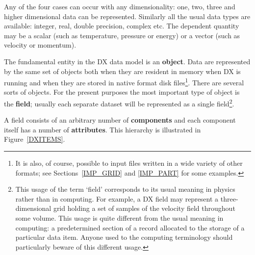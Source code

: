 \documentclass[twoside,11pt]{article}
\begin{document}
Any of the four cases can occur with any dimensionality: one, two,
three and higher dimensional data can be represented. Similarly all
the usual data types are available: integer, real, double precision,
complex etc. The dependent quantity may be a scalar (such as temperature,
pressure or energy) or a vector (such as velocity or momentum).

The fundamental entity in the DX data model is an {\bf object}. Data
are represented by the same set of objects both when they are resident
in memory when DX is running and when they are stored in native format
disk files\footnote{It is also, of course, possible to input files
written in a wide variety of other formats; see Sections~\ref{IMP_GRID}
and \ref{IMP_PART} for some examples.}. There are several sorts of objects.
For the present purposes the most important type of object is the {\bf
field}; usually each separate dataset will be represented as a single
field\footnote{This usage of the term `field' corresponds to its usual
meaning in physics rather than in computing. For example, a DX field may
represent a three-dimensional grid holding a set of samples of the
velocity field throughout some volume. This usage is quite different from
the usual meaning in computing: a predetermined section of a record
allocated to the storage of a particular data item. Anyone used to the
computing terminology should particularly beware of this different
usage.}.

A field consists of an arbitrary number of {\bf components} and each
component itself has a number of {\bf attributes}. This hierarchy is
illustrated in Figure~\ref{DXITEMS}.
\end{document}
